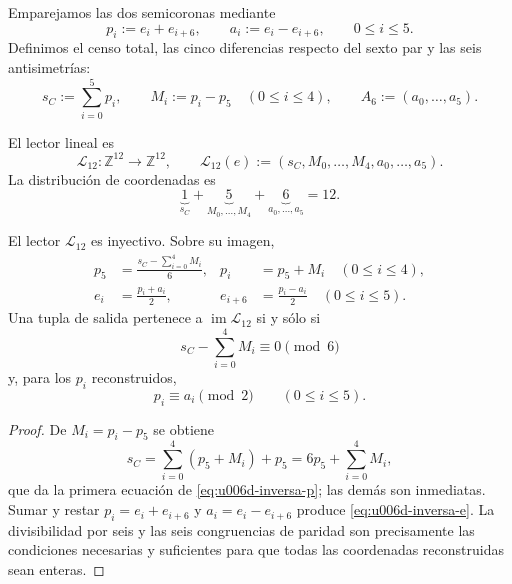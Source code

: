 Emparejamos las dos semicoronas mediante
\begin{equation}
 p_i:=e_i+e_{i+6},
 \qquad
 a_i:=e_i-e_{i+6},
 \qquad 0\leq i\leq5.
 \label{eq:u006d-pares-antipodales}
\end{equation}
Definimos el censo total, las cinco diferencias respecto del sexto par y
las seis antisimetrías:
\begin{equation}
 s_C:=\sum_{i=0}^{5}p_i,
 \qquad
 M_i:=p_i-p_5\quad(0\leq i\leq4),
 \qquad
 A_6:=(a_0,\ldots,a_5).
 \label{eq:u006d-coordenadas-uno-cinco-seis}
\end{equation}

\begin{definition}
\label{def:u006d-lector-integral}
El lector lineal es
\begin{equation}
 \mathcal L_{12}:\mathbb Z^{12}\longrightarrow\mathbb Z^{12},
 \qquad
 \mathcal L_{12}(e)
 :=
 (s_C,M_0,\ldots,M_4,a_0,\ldots,a_5).
 \label{eq:u006d-lector-l12}
\end{equation}
La distribución de coordenadas es
\begin{equation}
 \underbrace{1}_{s_C}
 +\underbrace{5}_{M_0,\ldots,M_4}
 +\underbrace{6}_{a_0,\ldots,a_5}
 =12.
 \label{eq:u006d-uno-cinco-seis}
\end{equation}
\end{definition}

\begin{theorem}
\label{thm:u006d-inversa-l12}
El lector \(\mathcal L_{12}\) es inyectivo. Sobre su imagen,
\begin{align}
 p_5&=
 \frac{s_C-\sum_{i=0}^{4}M_i}{6},
 &
 p_i&=p_5+M_i\quad(0\leq i\leq4),
 \label{eq:u006d-inversa-p}\\
 e_i&=\frac{p_i+a_i}{2},
 &
 e_{i+6}&=\frac{p_i-a_i}{2}
 \quad(0\leq i\leq5).
 \label{eq:u006d-inversa-e}
\end{align}
Una tupla de salida pertenece a \(\operatorname{im}\mathcal L_{12}\) si y
sólo si
\begin{equation}
 s_C-\sum_{i=0}^{4}M_i\equiv0\pmod6
 \label{eq:u006d-condicion-divisibilidad}
\end{equation}
y, para los \(p_i\) reconstruidos,
\begin{equation}
 p_i\equiv a_i\pmod2
 \qquad(0\leq i\leq5).
 \label{eq:u006d-condicion-paridad}
\end{equation}
\end{theorem}

\begin{proof}
De \(M_i=p_i-p_5\) se obtiene
\[
 s_C=\sum_{i=0}^{4}(p_5+M_i)+p_5
 =6p_5+\sum_{i=0}^{4}M_i,
\]
que da la primera ecuación de \eqref{eq:u006d-inversa-p}; las demás son
inmediatas. Sumar y restar
\(p_i=e_i+e_{i+6}\) y \(a_i=e_i-e_{i+6}\) produce
\eqref{eq:u006d-inversa-e}. La divisibilidad por seis y las seis
congruencias de paridad son precisamente las condiciones necesarias y
suficientes para que todas las coordenadas reconstruidas sean enteras.
\end{proof}

